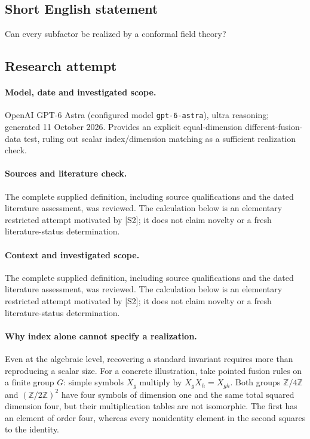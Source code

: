 \documentclass[11pt]{article}
\begin{document}
\subsection{Short English statement}
Can every subfactor be realized by a conformal field theory?
\subsection{Research attempt}
\paragraph{Model, date and investigated scope.}
OpenAI GPT-6 Astra (configured model \texttt{gpt-6-astra}), ultra reasoning; generated 11 October 2026. Provides an explicit equal-dimension different-fusion-data test, ruling out scalar index/dimension matching as a sufficient realization check.

\paragraph{Sources and literature check.}
The complete supplied definition, including source qualifications and the dated literature assessment, was reviewed. The calculation below is an elementary restricted attempt motivated by [S2]; it does not claim novelty or a fresh literature-status determination.

\paragraph{Context and investigated scope.} The complete supplied definition, including source qualifications and the dated literature assessment, was reviewed. The calculation below is an elementary restricted attempt motivated by [S2]; it does not claim novelty or a fresh literature-status determination.

\paragraph{Why index alone cannot specify a realization.} Even at the algebraic level, recovering a standard invariant requires more than reproducing a scalar size. For a concrete illustration, take pointed fusion rules on a finite group $G$: simple symbols $X_g$ multiply by $X_gX_h=X_{gh}$. Both groups $\mathbb Z/4\mathbb Z$ and $(\mathbb Z/2\mathbb Z)^2$ have four symbols of dimension one and the same total squared dimension four, but their multiplication tables are not isomorphic. The first has an element of order four, whereas every nonidentity element in the second squares to the identity.
\end{document}

